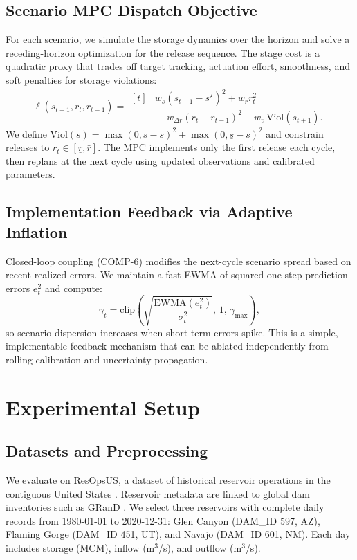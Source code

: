 \documentclass[conference]{IEEEtran}
\begin{document}
\subsection{Scenario MPC Dispatch Objective}
For each scenario, we simulate the storage dynamics over the horizon and solve a
receding-horizon optimization for the release sequence. The stage cost is a quadratic proxy
that trades off target tracking, actuation effort, smoothness, and soft penalties for storage
violations:
\begin{equation}
\ell(s_{t+1}, r_t, r_{t-1}) =
\begin{aligned}[t]
& w_s(s_{t+1}-s^\star)^2 + w_r r_t^2 \\
& {}+ w_{\Delta r}(r_t-r_{t-1})^2 + w_v\,\mathrm{Viol}(s_{t+1}).
\end{aligned}
\end{equation}
We define $\mathrm{Viol}(s) = \max(0, s-\bar{s})^2 + \max(0, \underline{s}-s)^2$ and constrain
releases to $r_t \in [\underline{r}, \bar{r}]$. The MPC implements only the first release each
cycle, then replans at the next cycle using updated observations and calibrated parameters.

\subsection{Implementation Feedback via Adaptive Inflation}
Closed-loop coupling (COMP-6) modifies the next-cycle scenario spread based on recent realized
errors. We maintain a fast EWMA of squared one-step prediction errors $e_t^2$ and compute:
\begin{equation}
\gamma_t = \mathrm{clip}\left(\sqrt{\frac{\mathrm{EWMA}(e_t^2)}{\sigma_t^2}},\, 1,\, \gamma_{\max}\right),
\end{equation}
so scenario dispersion increases when short-term errors spike. This is a simple, implementable
feedback mechanism that can be ablated independently from rolling calibration and uncertainty
propagation.

\section{Experimental Setup}

\subsection{Datasets and Preprocessing}
We evaluate on ResOpsUS, a dataset of historical reservoir operations in the contiguous United
States \cite{steyaert2022resopsus}. Reservoir metadata are linked to global dam inventories
such as GRanD \cite{lehner2011high}. We select three reservoirs with complete daily records
from 1980-01-01 to 2020-12-31: Glen Canyon (DAM\_ID 597, AZ), Flaming Gorge (DAM\_ID 451, UT),
and Navajo (DAM\_ID 601, NM). Each day includes storage (MCM), inflow (m$^3$/s), and outflow
(m$^3$/s).
\end{document}
